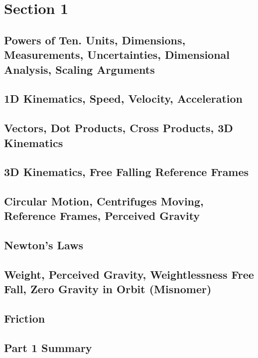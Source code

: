\documentclass[../introphysics.tex]{subfiles}
\begin{document}
\chapter{Section 1}
\section{Powers of Ten. Units, Dimensions, Measurements, Uncertainties, Dimensional Analysis, Scaling Arguments}
\section{1D Kinematics, Speed, Velocity, Acceleration}
\section{Vectors, Dot Products, Cross Products, 3D Kinematics}
\section{3D Kinematics, Free Falling Reference Frames}
\section{Circular Motion, Centrifuges Moving, Reference Frames, Perceived Gravity}
\section{Newton's Laws}
\section{Weight, Perceived Gravity, Weightlessness Free Fall, Zero Gravity in Orbit (Misnomer)}
\section{Friction}
\section{Part 1 Summary}
\end{document}
